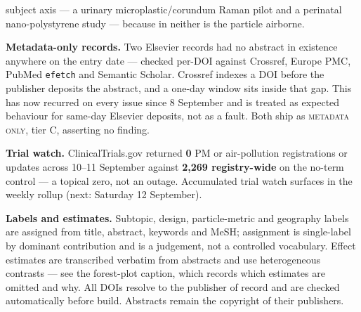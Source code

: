\documentclass[10pt]{article}
\begin{document}
\begin{keybox}
{subject axis --- a urinary microplastic/corundum Raman pilot and a perinatal
nano-polystyrene study --- because in neither is the particle airborne.\par
\vspace{0.8mm}
\textbf{Metadata-only records.} Two Elsevier records had no abstract in existence anywhere
on the entry date --- checked per-DOI against Crossref, Europe PMC, PubMed \texttt{efetch}
and Semantic Scholar. Crossref indexes a DOI before the publisher deposits the abstract,
and a one-day window sits inside that gap. This has now recurred on every issue since
8 September and is treated as expected behaviour for same-day Elsevier deposits, not as a
fault. Both ship as \textsc{metadata only}, tier C, asserting no finding.\par
\vspace{0.8mm}
\textbf{Trial watch.} ClinicalTrials.gov returned \textbf{0} PM or air-pollution
registrations or updates across 10--11 September against \textbf{2{,}269 registry-wide} on
the no-term control --- a topical zero, not an outage. Accumulated trial watch surfaces in
the weekly rollup (next: Saturday 12 September).\par
\vspace{0.8mm}
\textbf{Labels and estimates.} Subtopic, design, particle-metric and geography labels are
assigned from title, abstract, keywords and MeSH; assignment is single-label by dominant
contribution and is a judgement, not a controlled vocabulary. Effect estimates are
transcribed verbatim from abstracts and use heterogeneous contrasts --- see the forest-plot
caption, which records which estimates are omitted and why. All DOIs resolve to the
publisher of record and are checked automatically before build. Abstracts remain the
copyright of their publishers.\par}
\end{keybox}
\end{document}
